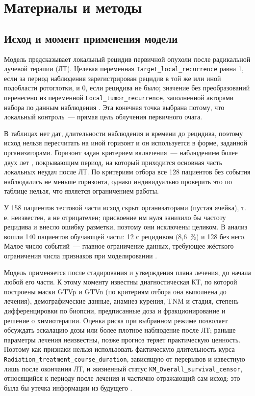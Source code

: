 \documentclass[11pt,a4paper,twocolumn]{article}
\newcommand{\var}[1]{\texttt{#1}}
\begin{document}
\thispagestyle{first}

\section*{Материалы и методы}

\subsection*{Исход и момент применения модели}

Модель предсказывает локальный рецидив первичной опухоли после радикальной лучевой терапии (ЛТ). Целевая переменная \var{Target\_local\_recurrence} равна 1, если за период наблюдения зарегистрирован рецидив в той же или иной подобласти ротоглотки, и 0, если рецидива не было; значение без преобразований перенесено из переменной \var{Local\_tumor\_recurrence}, заполненной авторами набора по данным наблюдения \parencite{elhalawani2017}. Эта конечная точка выбрана потому, что локальный контроль~--- прямая цель облучения первичного очага.

В таблицах нет дат, длительности наблюдения и времени до рецидива, поэтому исход нельзя пересчитать на иной горизонт и он используется в форме, заданной организаторами. Горизонт задан критерием включения~--- наблюдением более двух лет \parencite{elhalawani2017}, покрывающим период, на который приходится основная часть локальных неудач после ЛТ. По критериям отбора все 128 пациентов без события наблюдались не меньше горизонта, однако индивидуально проверить это по таблице нельзя, что является ограничением работы.

У 158 пациентов тестовой части исход скрыт организаторами (пустая ячейка), т.\,е. неизвестен, а не отрицателен; присвоение им нуля занизило бы частоту рецидива и внесло ошибку разметки, поэтому они исключены целиком. В анализ вошли 140 пациентов обучающей части: 12 с рецидивом (8,6~\%) и 128 без него. Малое число событий~--- главное ограничение данных, требующее жёсткого ограничения числа признаков при моделировании \parencite{riley2020}.

Модель применяется после стадирования и утверждения плана лечения, до начала любой его части. К этому моменту известны диагностическая КТ, по которой построены маски GTVp и GTVn (по критериям отбора она выполнена до лечения), демографические данные, анамнез курения, TNM и стадия, степень дифференцировки по биопсии, предписанные доза и фракционирование и решение о химиотерапии. Оценка риска при выбранном режиме позволяет обсуждать эскалацию дозы или более плотное наблюдение после ЛТ; раньше параметры лечения неизвестны, позже прогноз теряет практическую ценность. Поэтому как признаки нельзя использовать фактическую длительность курса \var{Radiation\_treatment\_course\_duration}, зависящую от перерывов и известную лишь после окончания ЛТ, и жизненный статус \var{KM\_Overall\_survival\_censor}, относящийся к периоду после лечения и частично отражающий сам исход: это была бы утечка информации из будущего \parencite{kaufman2012}.
\end{document}
